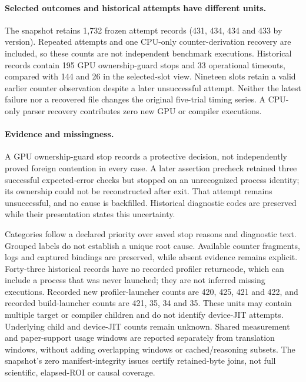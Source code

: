 \paragraph{Selected outcomes and historical attempts have different units.}
The snapshot retains 1,732 frozen attempt records (431, 434, 434 and 433 by version). Repeated attempts and one CPU-only counter-derivation recovery are included, so these counts are not independent benchmark executions. Historical records contain 195 GPU ownership-guard stops and 33 operational timeouts, compared with 144 and 26 in the selected-slot view. Nineteen slots retain a valid earlier counter observation despite a later unsuccessful attempt. Neither the latest failure nor a recovered file changes the original five-trial timing series. A CPU-only parser recovery contributes zero new GPU or compiler executions.

\paragraph{Evidence and missingness.}
A GPU ownership-guard stop records a protective decision, not independently proved foreign contention in every case. A later assertion precheck retained three successful expected-error checks but stopped on an unrecognized process identity; its ownership could not be reconstructed after exit. That attempt remains unsuccessful, and no cause is backfilled. Historical diagnostic codes are preserved while their presentation states this uncertainty.

Categories follow a declared priority over saved stop reasons and diagnostic text. Grouped labels do not establish a unique root cause. Available counter fragments, logs and captured bindings are preserved, while absent evidence remains explicit. Forty-three historical records have no recorded profiler returncode, which can include a process that was never launched; they are not inferred missing executions. Recorded new profiler-launcher counts are 420, 425, 421 and 422, and recorded build-launcher counts are 421, 35, 34 and 35. These units may contain multiple target or compiler children and do not identify device-JIT attempts. Underlying child and device-JIT counts remain unknown. Shared measurement and paper-support usage windows are reported separately from translation windows, without adding overlapping windows or cached/reasoning subsets. The snapshot's zero manifest-integrity issues certify retained-byte joins, not full scientific, elapsed-ROI or causal coverage.



